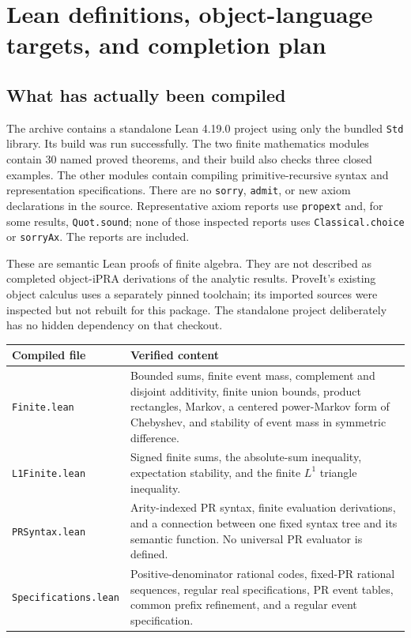 \section{Lean definitions, object-language targets, and completion plan}
\label{sec:formalization}

\subsection{What has actually been compiled}

The archive contains a standalone Lean 4.19.0 project using only the bundled
\texttt{Std} library. Its build was run successfully. The two finite
mathematics modules contain 30 named proved theorems, and their build also
checks three closed examples. The other modules contain compiling
primitive-recursive syntax and representation specifications. There are no
\texttt{sorry}, \texttt{admit}, or new axiom declarations in the source.
Representative axiom reports use \texttt{propext} and, for some results,
\texttt{Quot.sound}; none of those inspected reports uses
\texttt{Classical.choice} or \texttt{sorryAx}. The reports are included.

These are semantic Lean proofs of finite algebra. They are not described as
completed object-iPRA derivations of the analytic results. ProveIt's existing
object calculus uses a separately pinned toolchain; its imported sources were
inspected but not rebuilt for this package. The standalone project deliberately
has no hidden dependency on that checkout.

\begin{longtable}{>{\raggedright\arraybackslash}p{}>{\raggedright\arraybackslash}p{}}
\toprule
Compiled file & Verified content\\
\midrule\endhead
\texttt{Finite.lean} & Bounded sums, finite event mass, complement and disjoint
additivity, finite union bounds, product rectangles, Markov, a centered
power-Markov form of Chebyshev, and stability of event mass in symmetric
difference.\\
\texttt{L1Finite.lean} & Signed finite sums, the absolute-sum inequality,
expectation stability, and the finite $L^1$ triangle inequality.\\
\texttt{PRSyntax.lean} & Arity-indexed PR syntax, finite evaluation derivations,
and a connection between one fixed syntax tree and its semantic function.
No universal PR evaluator is defined.\\
\texttt{Specifications.lean} & Positive-denominator rational codes, fixed-PR
rational sequences, regular real specifications, PR event tables, common
prefix refinement, and a regular event specification.\\
\bottomrule
\end{longtable}

